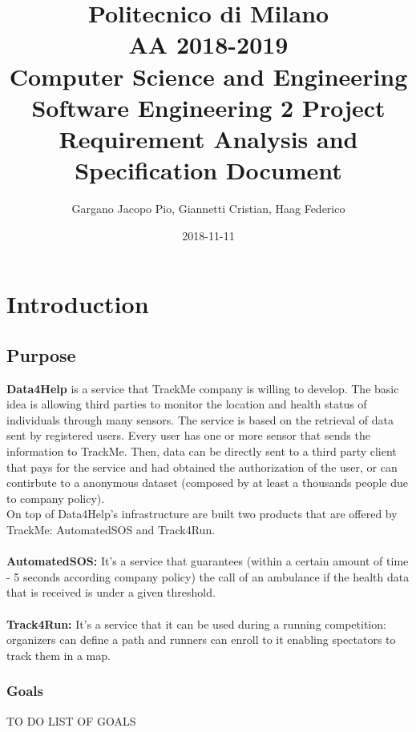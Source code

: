 \documentclass{report}
\title{
\small Politecnico di Milano\\
\small AA 2018-2019\\
\large Computer Science and Engineering\\
\Large Software Engineering 2 Project\\
\huge Requirement Analysis and Specification Document
}
\date{2018-11-11}
\author{
\large Gargano Jacopo Pio, Giannetti Cristian, Haag Federico}
\begin{document}
	\maketitle
	
	\newpage
	\tableofcontents
	
	\newpage
	\chapter{Introduction}
		\section{Purpose}
			{\bf Data4Help } is a service that TrackMe company is willing to develop. The basic idea is allowing third parties to monitor the location and health status of individuals through many sensors. The service is based on the retrieval of data sent by registered users. Every user has one or more sensor that sends the information to TrackMe. Then, data can be directly sent to a third party client that pays for the service and had obtained the authorization of the user, or can contirbute to a anonymous dataset (composed by at least a thousands people due to company policy).\\
			On top of Data4Help's infrastructure are built two products that are offered by TrackMe: AutomatedSOS and Track4Run.\\
			\\{\bf AutomatedSOS:} It's a service that guarantees (within a certain amount of time - 5 seconds according company policy) the call of an ambulance if the health data that is received is under a given threshold. \\\\{\bf Track4Run:} It's a service that it can be used during a running competition: organizers can define a path and runners can enroll to it enabling spectators to track them in a map.
			\subsection{Goals}
			TO DO LIST OF GOALS
\end{document}
